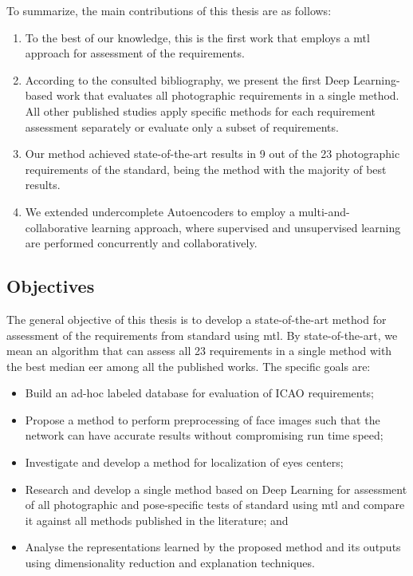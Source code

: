 To summarize, the main contributions of this thesis are as follows:
\begin{enumerate}
\item To the best of our knowledge, this is the first work that employs a \acl{mtl} approach for assessment of the \icao requirements.
 
\item According to the consulted bibliography, we present the first Deep Learning-based work that evaluates all photographic requirements in a single method. All other published studies apply specific methods for each requirement assessment separately or evaluate only a subset of requirements.
 
\item Our method achieved state-of-the-art results in 9 out of the 23 photographic requirements of the \icao standard, being the method with the majority of best results.
 
\item We extended undercomplete Autoencoders to employ a multi-and-collaborative learning approach, where supervised and unsupervised learning are performed concurrently and collaboratively.
\end{enumerate}
 
\subsection{Objectives}	
 
The general objective of this thesis is to develop a state-of-the-art method for assessment of the requirements from \icao standard using \acl{mtl}. By state-of-the-art, we mean an algorithm that can assess all 23 requirements in a single method with the best median \acs{eer} among all the published works. The specific goals are:
 
\begin{itemize}
\item Build an ad-hoc labeled database for evaluation of ICAO requirements;
\item Propose a method to perform preprocessing of face images such that the network can have accurate results without compromising run time speed;
\item Investigate and develop a method for localization of eyes centers;
\item Research and develop a single method based on Deep Learning for assessment of all photographic and pose-specific tests of \icao standard using \acf{mtl} and compare it against all methods published in the literature; and
\item Analyse the representations learned by the proposed method and its outputs using dimensionality reduction and explanation techniques.
\end{itemize}
 
